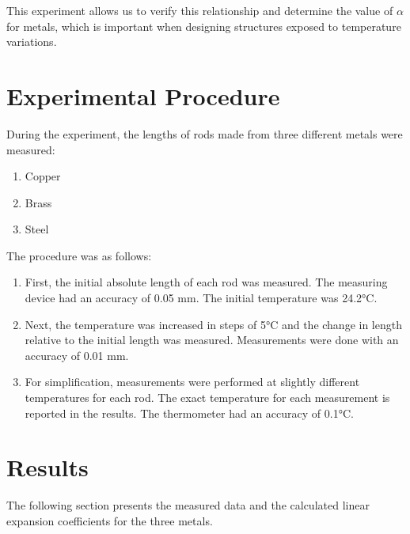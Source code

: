 \documentclass[a4paper,12pt]{article}
\begin{document}
This experiment allows us to verify this relationship and determine the value of $\alpha$ for metals, which is important when designing structures exposed to temperature variations.

\section{Experimental Procedure}

During the experiment, the lengths of rods made from three different metals were measured:
\begin{enumerate}
    \item Copper
    \item Brass
    \item Steel
\end{enumerate}

The procedure was as follows:

\begin{enumerate}
    \item First, the initial absolute length of each rod was measured. The measuring device had an accuracy of 0.05 mm. The initial temperature was 24.2°C.
    \item Next, the temperature was increased in steps of 5°C and the change in length relative to the initial length was measured. Measurements were done with an accuracy of 0.01 mm.
    \item For simplification, measurements were performed at slightly different temperatures for each rod. The exact temperature for each measurement is reported in the results. The thermometer had an accuracy of 0.1°C.
\end{enumerate}

\section{Results}

The following section presents the measured data and the calculated linear expansion coefficients for the three metals.
\end{document}
